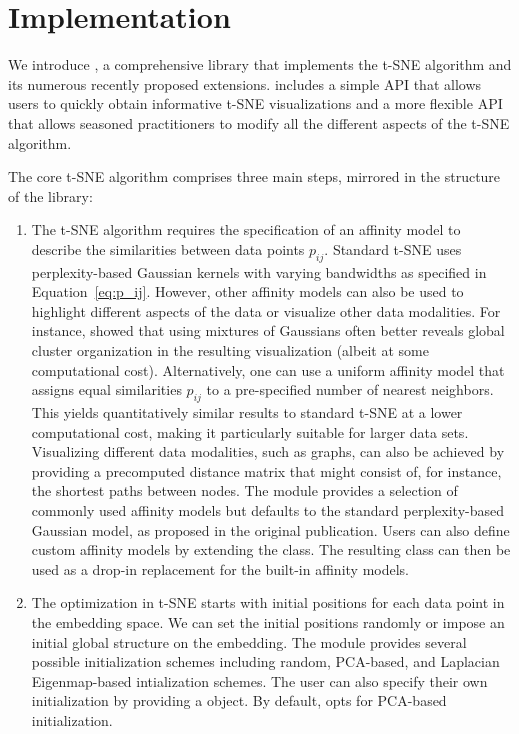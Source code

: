 \documentclass[article]{jss}
\newcommand{\opentsne}{\pkg{openTSNE}\xspace}
\begin{document}
\section{Implementation} \label{sec:implementation}

We introduce \opentsne, a comprehensive  library that implements the t-SNE algorithm and its numerous recently proposed extensions. \opentsne includes a simple API that allows users to quickly obtain informative t-SNE visualizations and a more flexible API that allows seasoned practitioners to modify all the different aspects of the t-SNE algorithm.

The core t-SNE algorithm comprises three main steps, mirrored in the structure of the \opentsne library:

\begin{enumerate}
\item The t-SNE algorithm requires the specification of an affinity model to describe the similarities between data points $p_{ij}$. Standard t-SNE uses perplexity-based Gaussian kernels with varying bandwidths as specified in Equation~\ref{eq:p_ij}. However, other affinity models can also be used to highlight different aspects of the data or visualize other data modalities. For instance, \citet{kobak2019art} showed that using mixtures of Gaussians often better reveals global cluster organization in the resulting visualization (albeit at some computational cost). Alternatively, one can use a uniform affinity model that assigns equal similarities $p_{ij}$ to a pre-specified number of nearest neighbors. This yields quantitatively similar results to standard t-SNE at a lower computational cost, making it particularly suitable for larger data sets. Visualizing different data modalities, such as graphs, can also be achieved by providing a precomputed distance matrix that might consist of, for instance, the shortest paths between nodes. The  module provides a selection of commonly used affinity models but defaults to the standard perplexity-based Gaussian model, as proposed in the original publication. Users can also define custom affinity models by extending the  class. The resulting class can then be used as a drop-in replacement for the built-in affinity models.

\item The optimization in t-SNE starts with initial positions for each data point in the embedding space. We can set the initial positions randomly or impose an initial global structure on the embedding. %
The  module provides several possible initialization schemes including random, PCA-based, and Laplacian Eigenmap-based intialization schemes. The user can also specify their own initialization by providing a  object. By default, \opentsne opts for PCA-based initialization.


\end{enumerate}
\end{document}
